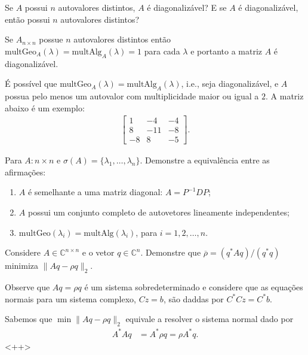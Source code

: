 \begin{questions}
     Se $A$ possui $n$ autovalores distintos, $A$ \'{e} diagonaliz\'{a}vel? E se $A$ \'{e} diagonaliz\'{a}vel, ent\~{a}o possui $n$ autovalores distintos?
    \begin{solution}
        Se $A_{n \times n}$ possue $n$ autovalores distintos ent\~{a}o $\text{multGeo}_A(\lambda) = \text{multAlg}_A(\lambda) = 1$ para cada $\lambda$ e portanto a matriz $A$ \'{e} diagonaliz\'{a}vel.

        \'{E} poss\'{i}vel que $\text{multGeo}_A(\lambda) = \text{multAlg}_A(\lambda)$, i.e., seja diagonaliz\'{a}vel, e $A$ possua pelo menos um autovalor com multiplicidade maior ou igual a $2$. A matriz abaixo \'{e} um exemplo:
        \begin{align*}
            \begin{bmatrix}
                1 & -4 & -4 \\
                8 & -11 & - 8 \\
                -8 & 8 & -5
            \end{bmatrix}.
        \end{align*}
    \end{solution}

    \question Para $A : n \times n$ e $\sigma(A) = \{ \lambda_1, \ldots, \lambda_n \}$. Demonstre a equival\^{e}ncia entre as afirma\c{c}\~{o}es:
    \begin{enumerate}
        \item $A$ \'{e} semelhante a uma matriz diagonal: $A = P^{-1} D P$;
        \item $A$ possui um conjunto completo de autovetores lineamente independentes;
        \item $\mathrm{multGeo}(\lambda_i) = \mathrm{multAlg}(\lambda_i)$, para $i = 1, 2, \ldots, n$.
    \end{enumerate}
    \begin{solution}
    \end{solution}

     Considere $A \in \mathbb{C}^{n \times n}$ e o vetor $q \in \mathbb{C}^n$. Demonstre que $\overline{\rho} = \left( q^* A q \right) / \left( q^* q \right)$ minimiza $\| A q - \rho q \|_2$.

    Observe que $A q = \rho q$ \'{e} um sistema sobredeterminado e considere que as equa\c{c}\~{o}es normais para um sistema complexo, $C z = b$, s\~{a}o daddas por $C^* C z = C^* b$.
    \begin{solution}
        Sabemos que $\min \| A q - \rho q \|_2$ equivale a resolver o sistema normal dado por
        \begin{align*}
            A^* A q &= A^* \rho q = \rho A^* q.
        \end{align*}<++>
    \end{solution}


\end{questions}
